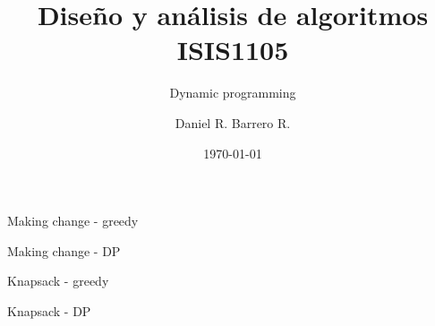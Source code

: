 \documentclass{beamer}
\title{Diseño y análisis de algoritmos\\ ISIS1105}
\subtitle{Dynamic programming}
\author{Daniel R. Barrero R.}
\date{\today}
\begin{document}
\frame{\titlepage}

%

\begin{frame}{Making change - greedy}
	
\end{frame}

%

\begin{frame}{Making change - DP}
\end{frame}

%

\begin{frame}{Knapsack - greedy}
\end{frame}

%

\begin{frame}{Knapsack - DP}
\end{frame}
\end{document}
